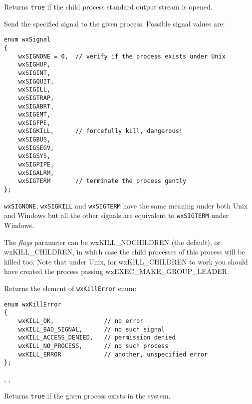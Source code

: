 Returns {\tt true} if the child process standard output stream is opened.

\label{wxprocesskill}


Send the specified signal to the given process. Possible signal values are:

\begin{verbatim}
enum wxSignal
{
    wxSIGNONE = 0,  // verify if the process exists under Unix
    wxSIGHUP,
    wxSIGINT,
    wxSIGQUIT,
    wxSIGILL,
    wxSIGTRAP,
    wxSIGABRT,
    wxSIGEMT,
    wxSIGFPE,
    wxSIGKILL,      // forcefully kill, dangerous!
    wxSIGBUS,
    wxSIGSEGV,
    wxSIGSYS,
    wxSIGPIPE,
    wxSIGALRM,
    wxSIGTERM       // terminate the process gently
};
\end{verbatim}

{\tt wxSIGNONE}, {\tt wxSIGKILL} and {\tt wxSIGTERM} have the same meaning
under both Unix and Windows but all the other signals are equivalent to
{\tt wxSIGTERM} under Windows.

The {\it flags} parameter can be wxKILL\_NOCHILDREN (the default),
or wxKILL\_CHILDREN, in which case the child processes of this
process will be killed too. Note that under Unix, for wxKILL\_CHILDREN
to work you should have created the process passing wxEXEC\_MAKE\_GROUP\_LEADER.

Returns the element of {\tt wxKillError} enum:

\begin{verbatim}
enum wxKillError
{
    wxKILL_OK,              // no error
    wxKILL_BAD_SIGNAL,      // no such signal
    wxKILL_ACCESS_DENIED,   // permission denied
    wxKILL_NO_PROCESS,      // no such process
    wxKILL_ERROR            // another, unspecified error
};
\end{verbatim}


,\rtfsp
{},\rtfsp
{}

\label{wxprocessexists}


Returns {\tt true} if the given process exists in the system.


